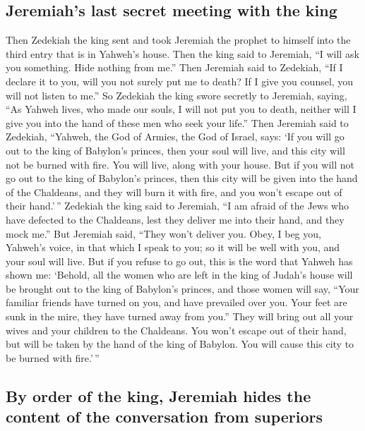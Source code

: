 \hypertarget{jeremiahs-last-secret-meeting-with-the-king}{%
\subsection{Jeremiah's last secret meeting with the
king}\label{jeremiahs-last-secret-meeting-with-the-king}}

 Then Zedekiah the king sent and took Jeremiah the
prophet to himself into the third entry that is in Yahweh's house. Then
the king said to Jeremiah, ``I will ask you something. Hide nothing from
me.''  Then Jeremiah said to Zedekiah, ``If I declare it
to you, will you not surely put me to death? If I give you counsel, you
will not listen to me.''  So Zedekiah the king swore
secretly to Jeremiah, saying, ``As Yahweh lives, who made our souls, I
will not put you to death, neither will I give you into the hand of
these men who seek your life.''  Then Jeremiah said to
Zedekiah, ``Yahweh, the God of Armies, the God of Israel, says: `If you
will go out to the king of Babylon's princes, then your soul will live,
and this city will not be burned with fire. You will live, along with
your house.  But if you will not go out to the king of
Babylon's princes, then this city will be given into the hand of the
Chaldeans, and they will burn it with fire, and you won't escape out of
their hand.'\,''  Zedekiah the king said to Jeremiah, ``I
am afraid of the Jews who have defected to the Chaldeans, lest they
deliver me into their hand, and they mock me.''  But
Jeremiah said, ``They won't deliver you. Obey, I beg you, Yahweh's
voice, in that which I speak to you; so it will be well with you, and
your soul will live.  But if you refuse to go out, this
is the word that Yahweh has shown me:  `Behold, all the
women who are left in the king of Judah's house will be brought out to
the king of Babylon's princes, and those women will say, ``Your familiar
friends have turned on you, and have prevailed over you. Your feet are
sunk in the mire, they have turned away from you.''  They
will bring out all your wives and your children to the Chaldeans. You
won't escape out of their hand, but will be taken by the hand of the
king of Babylon. You will cause this city to be burned with fire.'\,''

\hypertarget{by-order-of-the-king-jeremiah-hides-the-content-of-the-conversation-from-superiors}{%
\subsection{By order of the king, Jeremiah hides the content of the
conversation from
superiors}\label{by-order-of-the-king-jeremiah-hides-the-content-of-the-conversation-from-superiors}}

